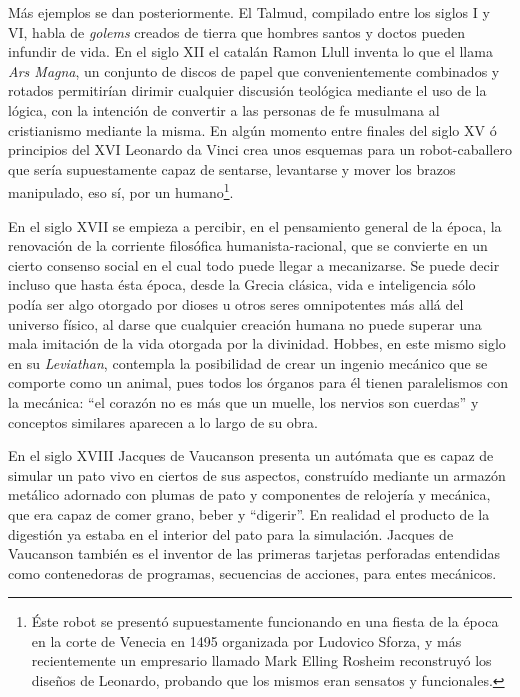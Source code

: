 \documentclass[12pt]{memoir}
\begin{document}
Más ejemplos se dan posteriormente. El Talmud, compilado entre los siglos I y VI, habla de \textit{golems} creados de tierra que hombres santos y doctos pueden infundir de vida. En el siglo XII el catalán Ramon Llull inventa lo que el llama \textit{Ars Magna}, un conjunto de discos de papel que convenientemente combinados y rotados permitirían dirimir cualquier discusión teológica mediante el uso de la lógica, con la intención de convertir a las personas de fe musulmana al cristianismo mediante la misma. En algún momento entre finales del siglo XV ó principios del XVI Leonardo da Vinci crea unos esquemas para un robot-caballero que sería supuestamente capaz de sentarse, levantarse y mover los brazos manipulado, eso sí, por un humano\footnote{Éste robot se presentó supuestamente funcionando en una fiesta de la época en la corte de Venecia en 1495 organizada por Ludovico Sforza, y más recientemente un empresario llamado Mark Elling Rosheim reconstruyó los diseños de Leonardo, probando que los mismos eran sensatos y funcionales.}. 

En el siglo XVII se empieza a percibir, en el pensamiento general de la época, la renovación de la corriente filosófica humanista-racional, que se convierte en un cierto consenso social en el cual todo puede llegar a mecanizarse. Se puede decir incluso que hasta ésta época, desde la Grecia clásica, vida e inteligencia sólo podía ser algo otorgado por dioses u otros seres omnipotentes más allá del universo físico, al darse que cualquier creación humana no puede superar una mala imitación de la vida otorgada por la divinidad. Hobbes, en este mismo siglo en su \textit{Leviathan}, contempla la posibilidad de crear un ingenio mecánico que se comporte como un animal, pues todos los órganos para él tienen paralelismos con la mecánica: ``el corazón no es más que un muelle, los nervios son cuerdas'' y conceptos similares aparecen a lo largo de su obra. 

En el siglo XVIII Jacques de Vaucanson presenta un autómata que es capaz de simular un pato vivo en ciertos de sus aspectos, construído mediante un armazón metálico adornado con plumas de pato y componentes de relojería y mecánica, que era capaz de comer grano, beber y ``digerir''. En realidad el producto de la digestión ya estaba en el interior del pato para la simulación. Jacques de Vaucanson también es el inventor de las primeras tarjetas perforadas entendidas como contenedoras de programas, secuencias de acciones, para entes mecánicos. 
\end{document}
